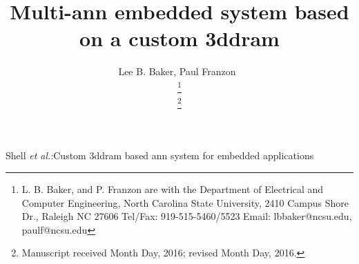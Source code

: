 \documentclass[journal]{IEEEtran}
\begin{document}
\title{Multi-\acs{ann} embedded system based on a custom \acs{3ddram}}
%
%
\author{{Lee B. Baker, Paul Franzon~}%

\thanks{L. B. Baker, and P. Franzon are with the Department of Electrical and Computer Engineering,
North Carolina State University,
2410 Campus Shore Dr., Raleigh NC 27606 
Tel/Fax:
919-515-5460/5523
Email: 
lbbaker@ncsu.edu,
paulf@ncsu.edu}

\thanks{Manuscript received Month Day, 2016; revised Month Day, 2016.}}


%
{Shell \MakeLowercase{\textit{et al.}}:Custom \acs{3ddram} based \acs{ann} system for embedded applications}

\maketitle
\end{document}
